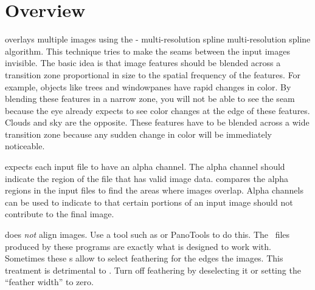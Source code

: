 

\chapter[Overview]{\label{sec:overview}%
  Overview}

%
%
%
%
%
\begin{sloppypar}
  \App{} overlays multiple images using the -
  multi-resolution spline multi-resolution spline algorithm.\footnotemark{} This technique tries
  to make the seams between the input images invisible.  The basic idea is that image features
  should be blended across a transition zone proportional in size to the spatial frequency of
  the features.  For example, objects like trees and windowpanes have rapid changes in color.
  By blending these features in a narrow zone, you will not be able to see the seam because the
  eye already expects to see color changes at the edge of these features.  Clouds and sky are
  the opposite.  These features have to be blended across a wide transition zone because any
  sudden change in color will be immediately noticeable.%
\end{sloppypar}

%
\App{} expects each input file to have an alpha channel.  The alpha channel should indicate the
region of the file that has valid image data.  \App{} compares the alpha regions in the input
files to find the areas where images overlap.  Alpha channels can be used to indicate to \App{}
that certain portions of an input image should not contribute to the final image.

%
%
%
\App{} does \emph{not} align images.  Use a tool such as  or PanoTools to do
this.  The ~files produced by these programs are exactly what \App{} is designed
to work with.  Sometimes these s allow to select feathering for the edges the
images.  This treatment is detrimental to \App{}.  Turn off feathering by deselecting it or
setting the ``feather width'' to zero.

